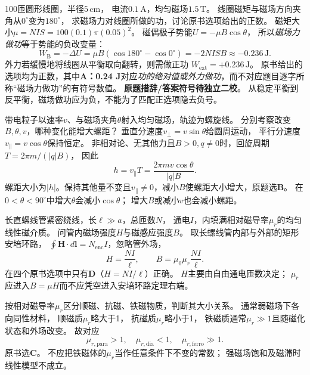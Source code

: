 \problemtext 100匝圆形线圈，半径$5\,\mathrm{cm}$，
电流$0.1\,\mathrm A$，均匀磁场$1.5\,\mathrm T$。
线圈磁矩与磁场方向夹角从$0^\circ$变为$180^\circ$，
求磁场力对线圈所做的功，讨论原书选项给出的正数。
\workings
磁矩大小$\mu=NIS=100(0.1)\pi(0.05)^2$。
磁偶极子势能$U=-\mu B\cos\theta$，
所以\emph{磁场力做功}等于势能的负改变量：
\[
\boxed{W_{\mathrm B}
=-\Delta U=\mu B(\cos180^\circ-\cos0^\circ)
=-2NISB\approx-0.236\,\mathrm J}.
\]
外力若缓慢地将线圈从平衡取向翻转，则需做正功
$\boxed{W_{\mathrm{ext}}=+0.236\,\mathrm J}$。
原书给出的选项均为正数，其中\textbf{A：0.24 J}对应\emph{功的绝对值或外力做功}，而不对应题目逐字所称“磁场力做功”的有符号数值。
\crosscheck \textbf{原题措辞/答案符号待独立二校}。
从稳定平衡到反平衡，磁场做功应为负，不能为了匹配正选项隐去负号。

\problemtext 带电粒子以速率$v$、与磁场夹角$\theta$射入均匀磁场，轨迹为螺旋线。
分别考察改变$B,\theta,v$，哪种变化能增大螺距？
\workings
垂直分速度$v_\perp=v\sin\theta$给圆周运动，
平行分速度$v_\parallel=v\cos\theta$保持恒定。
非相对论、无其他力且$B>0,q\ne0$时，回旋周期$T=2\pi m/(|q|B)$，
因此
\[
\boxed{h=v_\parallel T
=\frac{2\pi mv\cos\theta}{|q|B}}.
\]
螺距大小为$|h|$。保持其他量不变且$v_\parallel\ne0$，减小$B$使螺距大小增大，原题选\textbf{B}。
\crosscheck 在$0<\theta<90^\circ$中增大$\theta$会减小$\cos\theta$；
增大$B$或减小$v$也会减小螺距。

\problemtext 长直螺线管紧密绕线，长$\ell\gg a$，总匝数$N$，
通电$I$，内填满相对磁导率$\mu_r$的均匀线性磁介质。
问管内磁场强度$H$与磁感应强度$B$。
\workings
取长螺线管内部与外部的矩形安培环路，
$\oint\bm H\cdot d\bm l=N_{\mathrm{enc}}I$，忽略管外场，
\[
\boxed{H=\frac{NI}{\ell}},\qquad
\boxed{B=\mu_0\mu_r\frac{NI}{\ell}}.
\]
在四个原书选项中只有\textbf{D}（$H=NI/\ell$）正确。
\crosscheck $H$主要由自由通电匝数决定；
$\mu_r$应进入$B=\mu H$而不应凭空进入安培环路定理右端。

\problemtext 按相对磁导率$\mu_r$区分顺磁、抗磁、铁磁物质，判断其大小关系。
\workings
通常弱磁场下各向同性材料，
顺磁质$\mu_r$略大于1，
抗磁质$\mu_r$略小于1，
铁磁质通常$\mu_r\gg1$且随磁化状态和外场改变。
故对应
\[
\boxed{\mu_{r,\mathrm{para}}>1,\quad
\mu_{r,\mathrm{dia}}<1,\quad
\mu_{r,\mathrm{ferro}}\gg1}.
\]
原书选\textbf{C}。
\crosscheck 不应把铁磁体的$\mu_r$当作任意条件下不变的常数；
强磁场饱和及磁滞时线性模型不成立。

